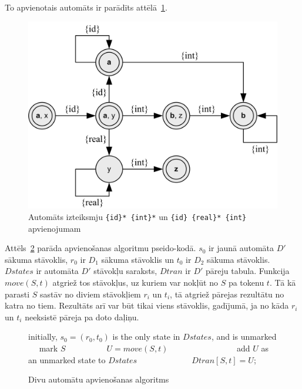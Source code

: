 To apvienotais automāts ir parādīts attēlā~\ref{fig:auto_merge}.

\begin{figure}[H]
  \centering
    \includegraphics[scale=1.5]{pictures/auto_merge}
  \caption{\label{fig:auto_merge}Automāts izteiksmju \texttt{\{id\}* \{int\}*} un \texttt{\{id\} \{real\}* \{int\}} apvienojumam}
\end{figure}

Attēls~\ref{fig:uni_algorithm} parāda apvienošanas algoritmu pseido-kodā. $s_0$ ir jaunā automāta $D'$ sākuma stāvoklis, $r_0$ ir $D_1$ sākuma stāvoklis un $t_0$ ir $D_2$ sākuma stāvoklis. $Dstates$ ir automāta $D'$ stāvokļu saraksts, $Dtran$ ir $D'$ pāreju tabula. Funkcija $move (S, t)$ atgriež tos stāvokļus, uz kuriem var nokļūt no $S$ pa tokenu $t$. Tā kā parasti $S$ sastāv no diviem stāvokļiem $r_i$ un $t_i$, tā atgriež pārejas rezultātu no katra no tiem. Rezultāts arī var būt tikai viens stāvoklis, gadījumā, ja no kāda $r_i$ un $t_i$ neeksistē pāreja pa doto daļiņu.

\begin{figure}[H]
  \begin{algorithmic}
  \State initially, $s_0 = (r_0, t_0)$ is the only state in $Dstates$, and is unmarked
      \State mark $S$
       
          \State $U = move (S, t)$
              \State add $U$ as an unmarked state to $Dstates$
          \EndIf
          \State $Dtran [S, t] = U$;
      \EndFor
  \EndWhile
  \end{algorithmic}
  \caption{\label{fig:uni_algorithm}Divu automātu apvienošanas algoritms}
\end{figure}

